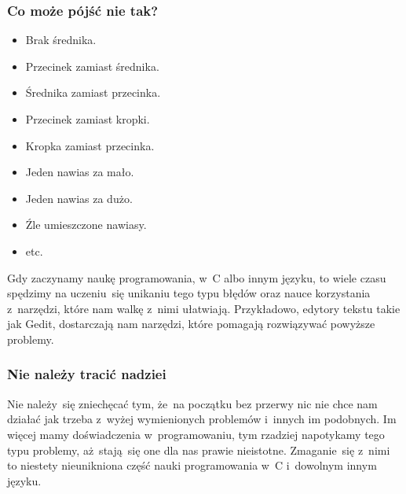 \documentclass[10pt,t]{beamer}
\begin{document}
\begin{frame}
  \frametitle{Co może pójść nie tak?}


  \begin{itemize}

  \item Brak średnika.

  \item Przecinek zamiast średnika.

  \item Średnika zamiast przecinka.

  \item Przecinek zamiast kropki.

  \item Kropka zamiast przecinka.

  \item Jeden nawias za mało.

  \item Jeden nawias za dużo.

  \item Źle umieszczone nawiasy.

  \item etc.

  \end{itemize}



  Gdy zaczynamy naukę programowania, w~C albo innym języku, to wiele czasu
  spędzimy na uczeniu~się unikaniu tego typu błędów oraz nauce korzystania
  z~narzędzi, które nam walkę z~nimi ułatwiają. Przykładowo, edytory
  tekstu takie jak Gedit, dostarczają nam narzędzi, które pomagają
  rozwiązywać powyższe problemy.

\end{frame}





\begin{frame}
  \frametitle{Nie należy tracić nadziei}


  Nie należy~się zniechęcać tym, że~na początku bez przerwy nic nie chce
  nam działać jak trzeba z~wyżej wymienionych problemów i~innych im
  podobnych. Im więcej mamy doświadczenia w~programowaniu, tym rzadziej
  napotykamy tego typu problemy, aż~stają~się one dla nas prawie nieistotne.
  Zmaganie~się z~nimi to niestety nieunikniona część nauki programowania
  w~C i~dowolnym innym języku.

\end{frame}
\end{document}
